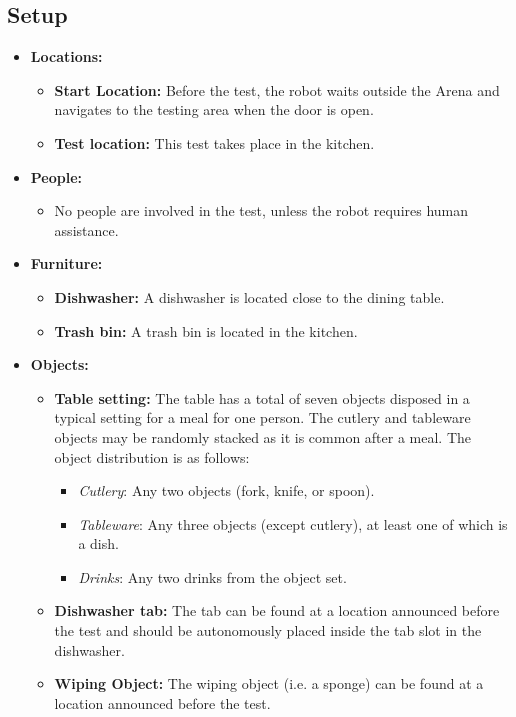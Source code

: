 \subsection*{Setup}
\begin{itemize}[nosep]
	\item \textbf{Locations:}
		\begin{itemize}
			\item \textbf{Start Location:} Before the test, the robot waits outside the Arena and navigates to the testing area when the door is open.
			\item \textbf{Test location:} This test takes place in the kitchen.
		\end{itemize}
	\item \textbf{People:}
		\begin{itemize}
			\item No people are involved in the test, unless the robot requires human assistance.
		\end{itemize}
	\item \textbf{Furniture:}
		\begin{itemize}
			\item \textbf{Dishwasher:} A dishwasher is located close to the dining table.
			\item \textbf{Trash bin:} A trash bin is located in the kitchen.
		\end{itemize}
	\item \textbf{Objects:}
		\begin{itemize}
			\item \textbf{Table setting:} The table has a total of seven objects disposed in a typical setting for a meal for one person. The cutlery and tableware objects may be randomly stacked as it is common after a meal. 
			The object distribution is as follows:
			\begin{itemize}[nosep]
				\item\textit{Cutlery}: Any two objects (fork, knife, or spoon).
				\item\textit{Tableware}: Any three objects (except cutlery), at least one of which is a dish.
				\item\textit{Drinks}: Any two drinks from the object set.
			\end{itemize}
			\item \textbf{Dishwasher tab:} The tab can be found at a location announced before the test and should be autonomously placed inside the tab slot in the dishwasher.
			\item \textbf{Wiping Object:} The wiping object (i.e. a sponge) can be found at a location announced before the test.
		\end{itemize}
\end{itemize}


